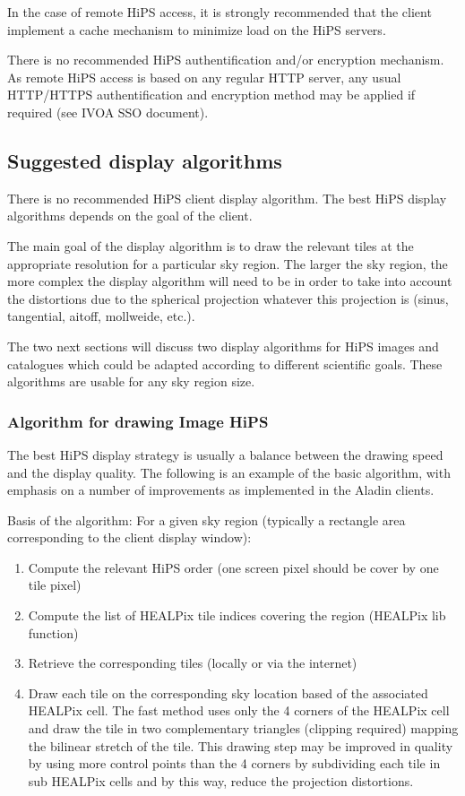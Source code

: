\documentclass[11pt,a4paper]{ivoa}
\begin{document}
In the case of remote HiPS access, it is strongly recommended that the client implement a cache mechanism to minimize load on the HiPS servers.

There is no recommended HiPS authentification and/or encryption mechanism. As remote HiPS access is based on any regular HTTP server, any usual HTTP/HTTPS authentification and encryption method may be applied if required (see IVOA SSO document).

\subsection{Suggested display algorithms}

There is no recommended HiPS client display algorithm. The best HiPS display algorithms depends on the goal of the client.

The main goal of the display algorithm is to draw the relevant tiles at the appropriate resolution for a particular sky region. The larger the sky region, the more complex the display algorithm will need to be in order to take into account the distortions due to the spherical projection whatever this projection is (sinus, tangential, aitoff, mollweide, etc.).

The two next sections will discuss two display algorithms for HiPS images and catalogues which could be adapted according to different scientific goals. These algorithms are usable for any sky region size.

\subsubsection{Algorithm for drawing Image HiPS}

The best HiPS display strategy is usually a balance between the drawing speed and the display quality. The following is an example of the basic algorithm, with emphasis on a number of improvements as implemented in the Aladin clients.

Basis of the algorithm: For a given sky region (typically a rectangle area corresponding to the client display window):

\begin{enumerate}
\item Compute the relevant HiPS order (one screen pixel should be cover by one tile pixel)
\item Compute the list of HEALPix tile indices covering the region (HEALPix lib function)
\item Retrieve the corresponding tiles (locally or via the internet)
\item Draw each tile on the corresponding sky location based of the associated HEALPix cell. The fast method uses only the 4 corners of the HEALPix cell and draw the tile in two complementary triangles (clipping required) mapping the bilinear stretch of the tile. This drawing step may be improved in quality by using more control points than the 4 corners by subdividing each tile in sub HEALPix cells and by this way, reduce the projection distortions.
\end{enumerate}
\end{document}
